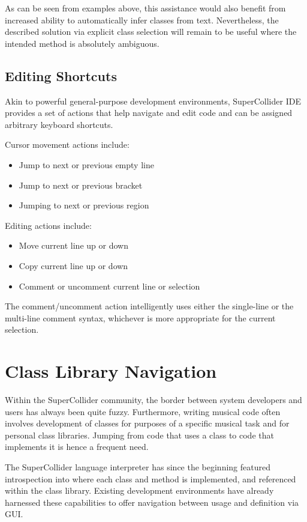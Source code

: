 \documentclass[11pt,a4paper]{article}
\begin{document}
As can be seen from examples above, this assistance would also benefit from increased ability to
automatically infer classes from text. Nevertheless, the described solution via explicit class
selection will remain to be useful where the intended method is absolutely ambiguous.

\subsection{Editing Shortcuts}

Akin to powerful general-purpose development environments, SuperCollider IDE provides a set of actions that help
navigate and edit code and can be assigned arbitrary keyboard shortcuts.

Cursor movement actions include:
\begin{itemize}
  \item Jump to next or previous empty line
  \item Jump to next or previous bracket
  \item Jumping to next or previous region
\end{itemize}

Editing actions include:
\begin{itemize}
 \item Move current line up or down
 \item Copy current line up or down
 \item Comment or uncomment current line or selection
\end{itemize}

The comment/uncomment action intelligently uses either the single-line or the multi-line comment syntax,
whichever is more appropriate for the current selection.

\section{Class Library Navigation}
\label{class-lib-lookup}

Within the SuperCollider community, the border between system developers and users has always been
quite fuzzy. Furthermore, writing musical code often involves development of classes for purposes of
a specific musical task and for personal class libraries. Jumping from code that uses a class to
code that implements it is hence a frequent need.

The SuperCollider language interpreter has since the beginning featured introspection into where
each class and method is implemented, and referenced within the class library. Existing development
environments have already harnessed these capabilities to offer navigation between usage and
definition via GUI.
\end{document}
